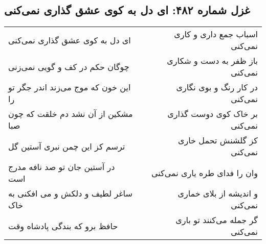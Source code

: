 \begin{center}
\section*{غزل شماره ۴۸۲: ای دل به کوی عشق گذاری نمی‌کنی}
\label{sec:sh482}
\begin{longtable}{l p{0.5cm} r}
ای دل به کوی عشق گذاری نمی‌کنی
&&
اسباب جمع داری و کاری نمی‌کنی
\\
چوگان حکم در کف و گویی نمی‌زنی
&&
باز ظفر به دست و شکاری نمی‌کنی
\\
این خون که موج می‌زند اندر جگر تو را
&&
در کار رنگ و بوی نگاری نمی‌کنی
\\
مشکین از آن نشد دم خلقت که چون صبا
&&
بر خاک کوی دوست گذاری نمی‌کنی
\\
ترسم کز این چمن نبری آستین گل
&&
کز گلشنش تحمل خاری نمی‌کنی
\\
در آستین جان تو صد نافه مدرج است
&&
وان را فدای طره یاری نمی‌کنی
\\
ساغر لطیف و دلکش و می افکنی به خاک
&&
و اندیشه از بلای خماری نمی‌کنی
\\
حافظ برو که بندگی پادشاه وقت
&&
گر جمله می‌کنند تو باری نمی‌کنی
\\
\end{longtable}
\end{center}
